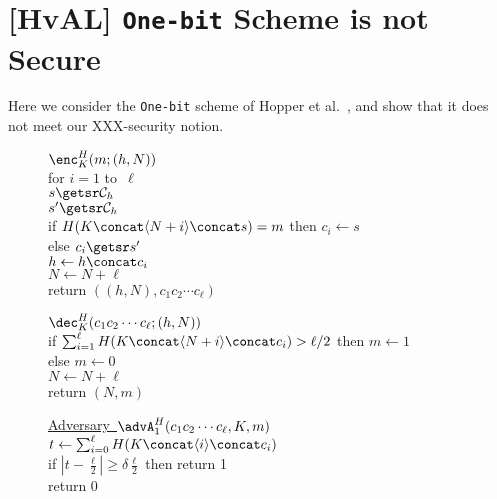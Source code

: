 \section{[HvAL] \texttt{One-bit} Scheme is not Secure}

Here we consider the \texttt{One-bit} scheme of Hopper et al.\
\cite{HvAL}, and show that it does not meet our XXX-security notion.

\begin{figure}[tph]
\begin{center}
{
\underline{$\enc^H_K(m;(h,N))$}\\[2pt]
for $i=1$ to~$\ell$\\
\nudge $s \getsr \mathcal{C}_h$\\
\nudge $s' \getsr \mathcal{C}_h$\\
\nudge if $H(K \concat \langle N+i \rangle \concat s)=m$ then $c_i \gets s$\\
\nudge else $c_i \getsr s'$\\
\nudge $h \gets h \concat c_i$\\
$N \gets N + \ell$\\
return $((h,N), c_1 c_2 \cdots c_\ell)$

\medskip
\underline{$\dec^H_K(c_1 c_2 \cdots c_\ell;(h,N))$}\\[2pt]
if $\sum_{i=1}^{\ell} H(K \concat \langle N+i \rangle \concat
c_i) > \ell/2$ then $m \gets 1$\\
else $m \gets 0$\\
$N \gets N+\ell$\\
return $(N,m)$
}
{
\underline{Adversary~$\advA_1^H(c_1 c_2 \cdots c_\ell, K, m)$}\\[2pt]
$t \gets \sum_{i=0}^{\ell} H(K \concat \langle i \rangle \concat c_i)$\\
if $\left| t - \frac{\ell}{2} \right| \geq \delta\frac{\ell}{2}$ 
 then return 1\\
return 0

}
\end{center}
\end{figure}
